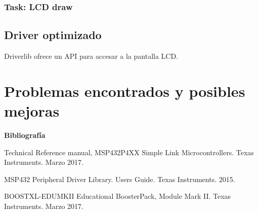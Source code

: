 \subsubsection{Task: LCD draw}
\label{sec:lcd_draw}


\subsection{Driver optimizado}
Driverlib ofrece un API para accesar a la pantalla LCD. 

\section{Problemas encontrados y posibles mejoras}


\textbf{ Bibliografía}

Technical Reference manual, MSP432P4XX Simple Link Microcontrollers. Texas Instruments. Marzo 2017.

MSP432 Peripheral Driver Library. Users Guide. Texas Instruments. 2015.

BOOSTXL-EDUMKII Educational BoosterPack, Module Mark II. Texas Instruments. Marzo 2017.


%
%
